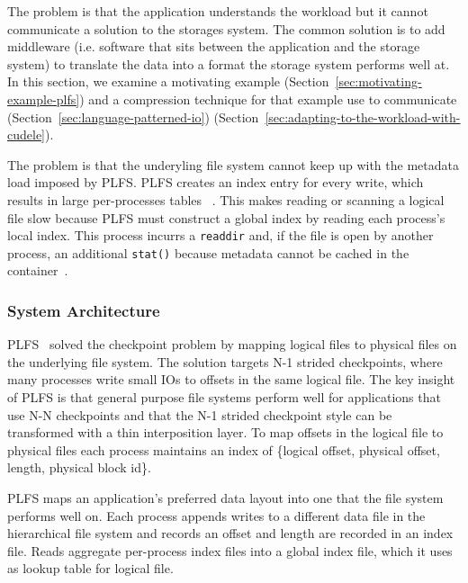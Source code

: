 The problem is that the application understands the workload but it cannot
communicate a solution to the storages system. The common solution is to add
middleware (i.e. software that sits between the application and the storage
system) to translate the data into a format the storage system performs well
at. In this section, we examine a motivating example
(Section~\ref{sec:motivating-example-plfs}) and a compression technique for that example
use to communicate (Section~\ref{sec:language-patterned-io})
(Section~\ref{sec:adapting-to-the-workload-with-cudele}).  

The problem is that the underyling file system cannot keep up with the metadata
load imposed by PLFS. PLFS creates an index entry for every write, which
results in large per-processes tables ~\cite{grider:pc17-diddlings}. This makes
reading or scanning a logical file slow because PLFS must construct a global
index by reading each process's local index. This process incurrs a
\texttt{readdir} and, if the file is open by another process, an additional
\texttt{stat()} because metadata cannot be cached in the
container~\cite{bent_plfs_2009}.

\subsubsection{System Architecture}
PLFS~\cite{bent_plfs_2009} solved the checkpoint problem by mapping logical
files to physical files on the underlying file system. The solution targets N-1
strided checkpoints, where many processes write small IOs to offsets in the
same logical file. The key insight of PLFS is that general purpose file systems
perform well for applications that use N-N checkpoints and that the N-1 strided
checkpoint style can be transformed with a thin interposition layer. To map
offsets in the logical file to physical files each process maintains an index
of \{logical offset, physical offset, length, physical block id\}. 

PLFS maps an application's preferred data layout into one that the file system
performs well on. Each process appends writes to a different data file in the
hierarchical file system and records an offset and length are recorded in an
index file. Reads aggregate per-process index files into a global index file,
which it uses as lookup table for logical file. 

